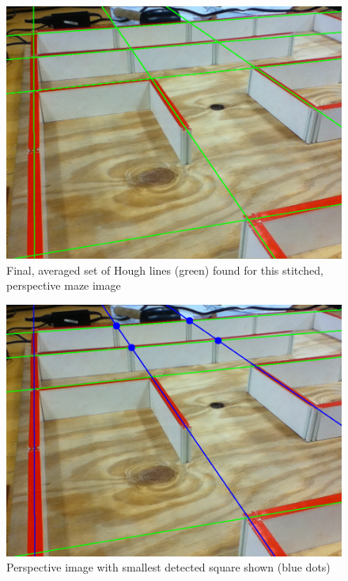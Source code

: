 \documentclass[10pt,twocolumn,letterpaper]{article}
\begin{document}
\begin{figure}[h!]
\begin{center}
		\includegraphics[width=0.8\linewidth]{images/houghlinesfinal.png}
\end{center}
\caption{Final, averaged set of Hough lines (green) found for this stitched, perspective maze image}
\label{fig:houghfinal}	
\end{figure}

\begin{figure}[h!]
\begin{center}
		\includegraphics[width=0.8\linewidth]{images/square.png}
\end{center}
\caption{Perspective image with smallest detected square shown (blue dots)}	
\label{fig:square}
\end{figure}
\end{document}
